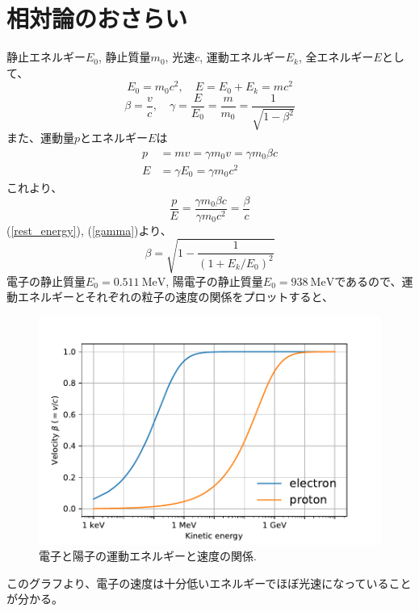 \documentclass[10pt,a4paper]{jlreq}
\begin{document}
\section{相対論のおさらい}
静止エネルギー$E_0$, 静止質量$m_0$, 光速$c$, 運動エネルギー$E_k$, 全エネルギー$E$として、
%
\begin{equation}
  E_0 = m_0 c^2 ,\quad E = E_0 + E_k = mc^2
  \label{rest_energy}
\end{equation}
%
\begin{equation}
  \beta =\frac{v}{c}, \quad \gamma = \frac{E}{E_0}=\frac{m}{m_0}=\frac{1}{\sqrt{1-\beta^2}}
  \label{gamma}
\end{equation}
%
また、運動量$p$とエネルギー$E$は
\begin{align}
  p &= mv = \gamma m_0 v = \gamma m_0 \beta c \label{momentum} \\
  E &= \gamma E_0 = \gamma m_0 c^2 \label{energy}
\end{align}
%
これより、
%
\begin{equation}
  \frac{p}{E} = \frac{\gamma m_0 \beta c}{\gamma m_0 c^2} = \frac{\beta}{c}
\end{equation}
%
(\ref{rest_energy}), (\ref{gamma})より、
%
\begin{equation}
  \beta = \sqrt{1-\frac{1}{\left(1+ E_k/E_0\right)^2}}
\end{equation}
%
電子の静止質量$E_0 = \SI{0.511}{\mega\electronvolt}$, 陽電子の静止質量$E_0 = \SI{938}{\mega\electronvolt}$であるので、運動エネルギーとそれぞれの粒子の速度の関係をプロットすると、
%
\begin{figure}[hhbt]
  \begin{center}
    \includegraphics[width=12cm,clip]{figs/velocity.pdf}
    \caption{電子と陽子の運動エネルギーと速度の関係.}
    \label{velocity}
  \end{center}
\end{figure}
%
このグラフより、電子の速度は十分低いエネルギーでほぼ光速になっていることが分かる。
%
\end{document}
